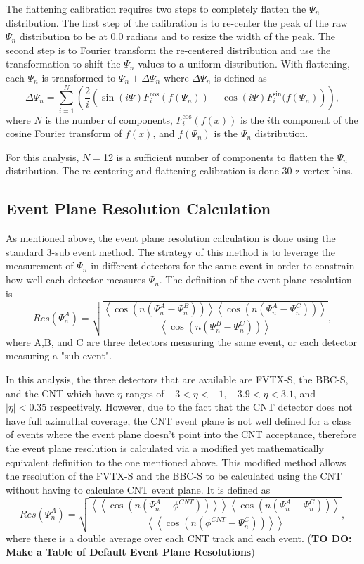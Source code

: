 The flattening calibration requires two steps to completely flatten the $\Psi_n$ distribution. The first step of the calibration is to re-center the peak of the raw $\Psi_n$ distribution to be at 
0.0 radians and to resize the width of the peak. The second step is to Fourier transform the re-centered distribution and use the transformation to shift the $\Psi_n$ values to a uniform distribution. With flattening, each $\Psi_n$ is transformed to $\Psi_n + \Delta\Psi_n$ where $\Delta\Psi_n$ is defined as
\begin{equation}
\Delta\Psi_n = \sum^{N}_{i=1}\left(\frac{2}{i}\left(\sin(i \Psi)F^{\cos}_{i}(f(\Psi_n))-\cos(i \Psi)F^{\sin}_{i}(f(\Psi_n)\right)\right),
\label{eq:deltapsi}
\end{equation}
where $N$ is the number of components, $F^{\cos}_{i}(f(x))$ is the $i$th component of the cosine Fourier transform of $f(x)$, and $f(\Psi_n)$ is the $\Psi_n$ distribution.

For this analysis, $N=$12 is a sufficient number of components to flatten the $\Psi_n$ distribution. The re-centering and flattening calibration is done 30 z-vertex bins.

\subsection{Event Plane Resolution Calculation}
As mentioned above, the event plane resolution calculation is done using the standard 3-sub event method. The strategy of this method is to leverage the measurement of $\Psi_n$ in
different detectors for the same event in order to constrain how well each detector measures $\Psi_n$. The definition of the event plane resolution is
\begin{equation}
Res(\Psi_n^A) = \sqrt{\frac{\left<\cos(n(\Psi_n^A - \Psi_n^B))\right>\left<\cos(n(\Psi_n^A - \Psi_n^C))\right>}{\left<\cos(n(\Psi_n^B - \Psi_n^C))\right>}},
\end{equation}
where A,B, and C are three detectors measuring the same event, or each detector measuring a "sub event".

In this analysis, the three detectors that are available are FVTX-S, the BBC-S, and the CNT which have $\eta$ ranges of $-3 <\eta < -1$, $-3.9 < \eta < 3.1$, and $|\eta| < 0.35$ respectively.
However, due to the fact that the CNT detector does not have full azimuthal coverage, the CNT event plane is not well defined for a class of events where the event plane doesn't point into the CNT acceptance, therefore the event plane resolution is calculated via a modified yet mathematically equivalent definition to the one mentioned above. This modified method allows the resolution of the FVTX-S and the BBC-S to be calculated using the CNT without having to calculate CNT event plane. It is defined as
\begin{equation}
Res(\Psi_n^A) = \sqrt{\frac{\left<\left<\cos(n(\Psi_n^A - \phi^{CNT}))\right>\right>\left<\cos(n(\Psi_n^A - \Psi_n^C))\right>}{\left<\left<\cos(n(\phi^{CNT} - \Psi_n^C))\right>\right>}},
\end{equation}
where there is a double average over each CNT track and each event.
(\textbf{TO DO: Make a Table of Default Event Plane Resolutions})
